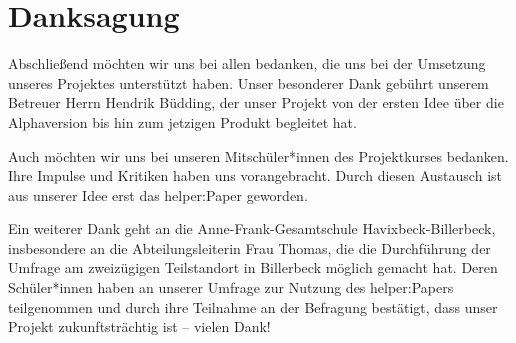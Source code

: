 \documentclass[10pt]{article}
\begin{document}
\section{Danksagung}
Abschließend möchten wir uns bei allen bedanken, die uns bei der Umsetzung unseres Projektes unterstützt haben.
Unser besonderer Dank gebührt unserem Betreuer Herrn Hendrik Büdding, der unser Projekt von der ersten Idee über die Alphaversion bis hin zum jetzigen Produkt begleitet hat.

Auch möchten wir uns bei unseren Mitschüler*innen des Projektkurses bedanken. Ihre Impulse und Kritiken haben uns vorangebracht. Durch diesen Austausch ist aus unserer Idee erst das helper:Paper geworden.

Ein weiterer Dank geht an die Anne-Frank-Gesamtschule Havixbeck-Billerbeck, insbesondere an die Abteilungsleiterin Frau Thomas, die die Durchführung der Umfrage am zweizügigen Teilstandort in Billerbeck möglich gemacht hat. Deren Schüler*innen haben an unserer Umfrage zur Nutzung des helper:Papers teilgenommen und durch ihre Teilnahme an der Befragung bestätigt, dass unser Projekt zukunftsträchtig ist – vielen Dank!

\newpage
\end{document}
